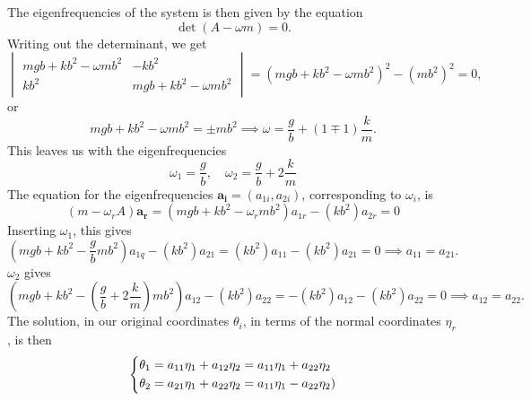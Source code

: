\documentclass{article}
\begin{document}
    The eigenfrequencies of the system is then given by the equation
    \begin{equation*}
        \det(A - \omega m) = 0.
    \end{equation*}
    Writing out the determinant, we get 
    \begin{equation*}
        \begin{vmatrix}
            mgb + kb^2 - \omega mb^2 & -kb^2 \\
            kb^2 & mgb + kb^2 - \omega mb^2
        \end{vmatrix}
         = (mgb + kb^2 - \omega mb^2)^2 - (mb^2)^2 = 0,
    \end{equation*}
    or
    \begin{equation*}
    mgb + kb^2 - \omega mb^2 = \pm mb^2 \implies \omega = \frac{g}{b} + (1 \mp 1)\frac{k}{m}.
    \end{equation*}
    This leaves us with the eigenfrequencies
    \begin{equation*}
        \omega_1 = \frac{g}{b}, \quad \omega_2 = \frac{g}{b} + 2 \frac{k}{m}
    \end{equation*}
    The equation for the eigenfrequencies $\mathbf{a_i} = (a_{1i}, a_{2i})$, corresponding to $\omega_i$, is
    \begin{equation*}
        (m - \omega_r A) \mathbf{a_r} = (mgb + kb^2 - \omega_r mb^2)a_{1r} -(kb^2)a_{2r} = 0
    \end{equation*}
    Inserting $\omega_1$, this gives 
    \begin{equation*}
        \left(mgb + kb^2 - \frac{g}{b} mb^2\right)a_{1q} -(kb^2)a_{21} = (kb^2)a_{11} -(kb^2)a_{21} = 0 \implies a_{11} = a_{21}.
    \end{equation*}
    $\omega_2$ gives 
    \begin{equation*}
        \left(mgb + kb^2 - \left(\frac{g}{b} +2\frac{k}{m}\right)mb^2\right)a_{12} -(kb^2)a_{22} = -(kb^2)a_{12} -(kb^2)a_{22} = 0 \implies a_{12} = a_{22}.
    \end{equation*}
    The solution, in our original coordinates $\theta_i$, in terms of the normal coordinates $\eta_r$, is then
    \begin{equation*}
        \begin{dcases}
            \theta_1 = a_{11} \eta_1 + a_{12} \eta_2 = a_{11} \eta_1 + a_{22}\eta_2 \\
            \theta_2 = a_{21} \eta_1 + a_{22} \eta_2 = a_{11} \eta_1 - a_{22} \eta_2) \\
        \end{dcases}
    \end{equation*}
\end{document}
